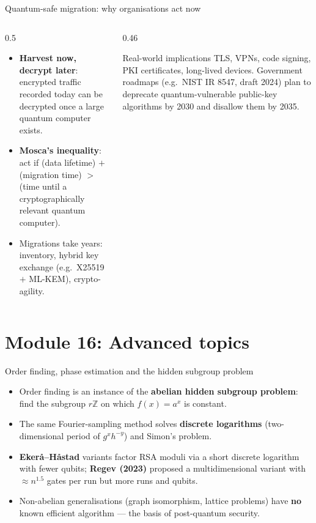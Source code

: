 \documentclass[aspectratio=169,11pt]{beamer}
\newcommand{\hl}[1]{{\color{qorange}\textbf{#1}}}
\newcommand{\key}[1]{{\color{qdark}\textbf{#1}}}
\begin{document}
\begin{frame}[label=fMigration]{Quantum-safe migration: why organisations act now}
  \small
  \begin{columns}[T]
    \begin{column}{0.5\textwidth}
      \begin{itemize}\itemsep2pt
        \item \key{Harvest now, decrypt later}: encrypted traffic recorded today can be decrypted once a large quantum computer exists.
        \item \key{Mosca's inequality}: act if (data lifetime) $+$ (migration time) $>$ (time until a cryptographically relevant quantum computer).
        \item Migrations take years: inventory, hybrid key exchange (e.g.\ X25519 $+$ ML-KEM), crypto-agility.
      \end{itemize}
    \end{column}
    \begin{column}{0.46\textwidth}
      \begin{block}{Real-world implications}
        \small TLS, VPNs, code signing, PKI certificates, long-lived devices. Government roadmaps (e.g.\ NIST IR 8547, draft 2024) plan to deprecate
        quantum-vulnerable public-key algorithms by 2030 and disallow them by 2035.
      \end{block}
    \end{column}
  \end{columns}
\end{frame}

\section{Module 16: Advanced topics}
\begin{frame}[label=fHSP]{Order finding, phase estimation and the hidden subgroup problem}
  \small
  \begin{itemize}\itemsep2pt
    \item Order finding is an instance of the \key{abelian hidden subgroup problem}: find the subgroup $r\mathbb Z$ on which $f(x) = a^x$ is constant.
    \item The same Fourier-sampling method solves \key{discrete logarithms} (two-dimensional period of $g^xh^{-y}$) and Simon's problem.
    \item \key{Ekerå--Håstad} variants factor RSA moduli via a short discrete logarithm with fewer qubits; \key{Regev (2023)} proposed a
          multidimensional variant with $\approx n^{1.5}$ gates per run but more runs and qubits.
    \item Non-abelian generalisations (graph isomorphism, lattice problems) have \hl{no} known efficient algorithm --- the basis of post-quantum security.
  \end{itemize}
\end{frame}
\end{document}
